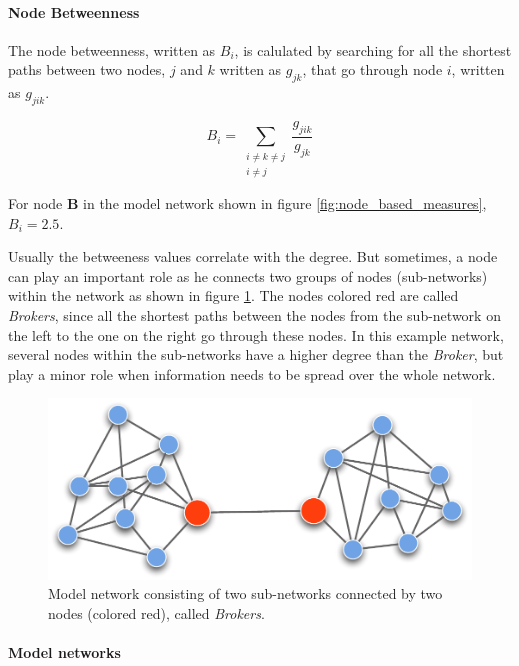 \paragraph{Node Betweenness}
\label{para:node_between}

The node betweenness, written as $B_i$, is calulated by searching for all the shortest paths between two nodes, $j$ and $k$ written as $g_{jk}$, that go through node $i$, written as $g_{jik}$.

\begin{equation}
B_i =	\sum_{
			\substack{i \neq k \neq j \\ i \neq j}
		}
		\frac{g_{jik}}{g_{jk}}
\end{equation}

For node \textbf{B} in the model network shown in figure \ref{fig:node_based_measures}, $B_i = 2.5$.

Usually the betweeness values correlate with the degree. But sometimes, a node can play an important role as he connects two groups of nodes (sub-networks) within the network as shown in figure \ref{fig:broker}. The nodes colored red are called \textit{Brokers}\cite{lusseau:04}, since all the shortest paths between the nodes from the sub-network on the left to the one on the right go through these nodes. In this example network, several nodes within the sub-networks have a higher degree than the \textit{Broker}, but play a minor role when information needs to be spread over the whole network.   

\begin{figure}[htpb]
\begin{center}
  \includegraphics[width=.75\textwidth]{assets/pdf/broker.pdf}
  \caption[Model network consisting of two groups]{Model network consisting of two sub-networks connected by two nodes (colored red), called \textit{Brokers}.}
  \label{fig:broker}
\end{center}
\end{figure}

\paragraph{Model networks}
\label{para:model_networks}

